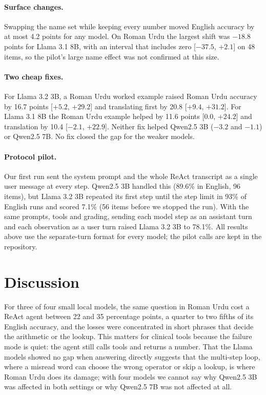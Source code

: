 \documentclass[11pt]{article}
\begin{document}
\paragraph{Surface changes.} Swapping the name set while keeping every number moved English accuracy by at most 4.2 points for any model. On Roman Urdu the largest shift was $-18.8$ points for Llama 3.1 8B, with an interval that includes zero [$-37.5$, $+2.1$] on 48 items, so the pilot's large name effect was not confirmed at this size.

\paragraph{Two cheap fixes.} For Llama 3.2 3B, a Roman Urdu worked example raised Roman Urdu accuracy by 16.7 points [$+5.2$, $+29.2$] and translating first by 20.8 [$+9.4$, $+31.2$]. For Llama 3.1 8B the Roman Urdu example helped by 11.6 points [$0.0$, $+24.2$] and translation by 10.4 [$-2.1$, $+22.9$]. Neither fix helped Qwen2.5 3B ($-3.2$ and $-1.1$) or Qwen2.5 7B. No fix closed the gap for the weaker models.

\paragraph{Protocol pilot.} Our first run sent the system prompt and the whole ReAct transcript as a single user message at every step. Qwen2.5 3B handled this (89.6\% in English, 96 items), but Llama 3.2 3B repeated its first step until the step limit in 93\% of English runs and scored 7.1\% (56 items before we stopped the run). With the same prompts, tools and grading, sending each model step as an assistant turn and each observation as a user turn raised Llama 3.2 3B to 78.1\%. All results above use the separate-turn format for every model; the pilot calls are kept in the repository.

\section{Discussion}
For three of four small local models, the same question in Roman Urdu cost a ReAct agent between 22 and 35 percentage points, a quarter to two fifths of its English accuracy, and the losses were concentrated in short phrases that decide the arithmetic or the lookup. This matters for clinical tools because the failure mode is quiet: the agent still calls tools and returns a number. That the Llama models showed no gap when answering directly suggests that the multi-step loop, where a misread word can choose the wrong operator or skip a lookup, is where Roman Urdu does its damage; with four models we cannot say why Qwen2.5 3B was affected in both settings or why Qwen2.5 7B was not affected at all.
\end{document}
